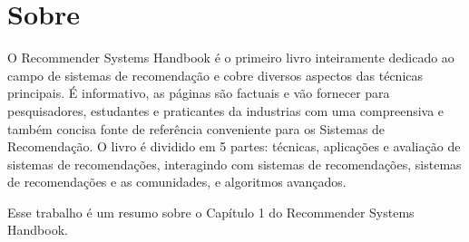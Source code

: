 \section{Sobre}

O Recommender Systems Handbook é o primeiro livro inteiramente dedicado ao  campo de sistemas de recomendação e cobre diversos aspectos das técnicas principais. É informativo, as páginas são factuais e vão fornecer para pesquisadores, estudantes e praticantes da industrias com uma compreensiva e também concisa fonte de referência conveniente para os Sistemas de Recomendação. O livro é dividido em 5 partes: técnicas, aplicações e avaliação de sistemas de recomendações, interagindo com sistemas de recomendações, sistemas de recomendações e as comunidades, e algoritmos avançados.
\par
Esse trabalho é um resumo sobre o Capítulo 1 do Recommender Systems Handbook.
